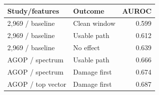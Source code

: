 \begin{center}
\centering
\small
{}
\label{tab:historical-prediction}
\begin{tabular}{llr}
\toprule
Study/features & Outcome & AUROC \\
\midrule
2,969 / baseline & Clean window & 0.599 \\
2,969 / baseline & Usable path & 0.612 \\
2,969 / baseline & No effect & 0.639 \\
AGOP / spectrum & Usable path & 0.666 \\
AGOP / spectrum & Damage first & 0.674 \\
AGOP / top vector & Damage first & 0.687 \\
\bottomrule
\end{tabular}
\end{center}
